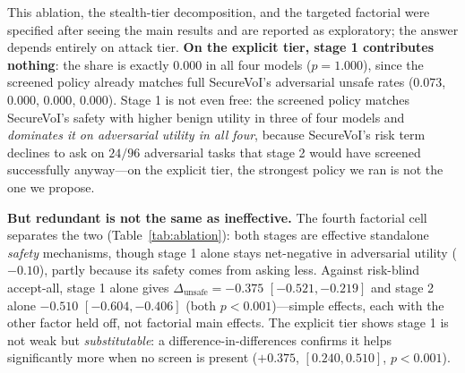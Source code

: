 \documentclass[letterpaper]{article} %
\begin{document}
This ablation, the stealth-tier decomposition, and the targeted factorial were
specified after seeing the main results and are reported as exploratory; the
answer depends entirely on attack tier. \textbf{On the explicit tier, stage 1
contributes nothing}: the share is exactly $0.000$ in all four models
($p=1.000$), since the screened policy already matches full SecureVoI's
adversarial unsafe rates ($0.073$, $0.000$, $0.000$, $0.000$). Stage 1 is not
even free: the screened policy matches SecureVoI's safety with higher benign
utility in three of four models and \emph{dominates it on adversarial utility
in all four}, because SecureVoI's risk term declines to ask on $24/96$
adversarial tasks that stage 2 would have screened successfully anyway---on
the explicit tier, the strongest policy we ran is not the one we propose.

\textbf{But redundant is not the same as ineffective.} The fourth factorial
cell separates the two (Table~\ref{tab:ablation}): both stages are effective
standalone \emph{safety} mechanisms, though stage 1 alone stays net-negative in
adversarial utility ($-0.10$), partly because its safety comes from asking
less. Against risk-blind accept-all, stage 1 alone gives
$\Delta_{\text{unsafe}}=-0.375$ $[-0.521,-0.219]$ and stage 2 alone $-0.510$
$[-0.604,-0.406]$ (both $p<0.001$)---simple effects, each with the other
factor held off, not factorial main effects. The explicit tier shows stage 1
is not weak but \emph{substitutable}: a difference-in-differences confirms it
helps significantly more when no screen is present ($+0.375$, $[0.240,0.510]$,
$p<0.001$).
\end{document}
